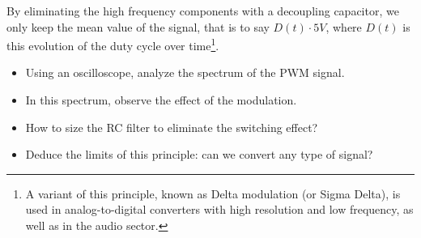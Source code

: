 \documentclass[11pt,a4paper]{article}
\theoremstyle{definition}%
\begin{document}
By eliminating the high frequency components with a decoupling capacitor, we only keep the mean value of the signal, that is to say $D(t) \cdot 5V$, where $D(t)$ is this evolution of the duty cycle over time\footnote{A variant of this principle, known as Delta modulation (or Sigma Delta), is used in analog-to-digital converters with high resolution and low frequency, as well as in the audio sector.}.

\begin{itemize}
	\item Using an oscilloscope, analyze the spectrum of the PWM signal.
	\item In this spectrum, observe the effect of the modulation.
	\item How to size the RC filter to eliminate the switching effect?
	\item Deduce the limits of this principle: can we convert any type of signal?
\end{itemize}
\end{document}
